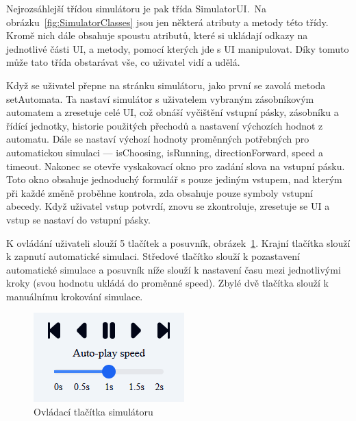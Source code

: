 Nejrozsáhlejší třídou simulátoru je pak třída SimulatorUI.\ Na obrázku~\ref{fig:SimulatorClasses} jsou jen některá atributy a metody této třídy. Kromě nich dále obsahuje spoustu atributů, které si ukládají odkazy na jednotlivé části UI, a metody, pomocí kterých jde s UI manipulovat. Díky tomuto může tato třída obstarávat vše, co uživatel vidí a udělá.

Když se uživatel přepne na stránku simulátoru, jako první se zavolá metoda setAutomata. Ta nastaví simulátor s uživatelem vybraným zásobníkovým automatem a zresetuje celé UI, což obnáší vyčištění vstupní pásky, zásobníku a řídící jednotky, historie použitých přechodů a nastavení výchozích hodnot z automatu. Dále se nastaví výchozí hodnoty proměnných potřebných pro automatickou simulaci --- isChoosing, isRunning, directionForward, speed a timeout. Nakonec se otevře vyskakovací okno pro zadání slova na vstupní pásku. Toto okno obsahuje jednoduchý formulář s pouze jediným vstupem, nad kterým při každé změně proběhne kontrola, zda obsahuje pouze symboly vstupní abecedy. Když uživatel vstup potvrdí, znovu se zkontroluje, zresetuje se UI a vstup se nastaví do vstupní pásky.

K ovládání uživateli slouží 5 tlačítek a posuvník, obrázek~\ref{fig:SimulatorButtons}. Krajní tlačítka slouží k zapnutí automatické simulaci. Středové tlačítko slouží k pozastavení automatické simulace a posuvník níže slouží k nastavení času mezi jednotlivými kroky (svou hodnotu ukládá do proměnné speed). Zbylé dvě tlačítka slouží k manuálnímu krokování simulace.

\begin{figure}[h]
    \centering
    \includegraphics{Figures/PrntScrn_SimulatorButtons.png}
    \caption{Ovládací tlačítka simulátoru}\label{fig:SimulatorButtons}
\end{figure}

